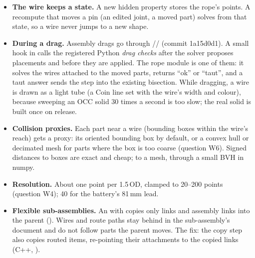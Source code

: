 \begin{itemize}
  \item \textbf{The wire keeps a state.} A new hidden property stores the rope's points. A recompute that moves a
        pin (an edited joint, a moved part) solves from that state, so a wire never jumps to a new shape.
  \item \textbf{During a drag.} Assembly drags go through //
        (commit 1a15d0d1). A small \code{[BW]} hook in  calls the registered
        Python \emph{drag checks} after the solver proposes placements and before they are applied. The rope
        module is one of them: it solves the wires attached to the moved parts, returns ``ok'' or ``taut'', and
        a taut answer sends the step into the existing bisection. While dragging, a wire is drawn as a light
        tube (a Coin line set with the wire's width and colour), because sweeping an OCC solid 30 times a second is
        too slow; the real solid is built once on release.
  \item \textbf{Collision proxies.} Each part near a wire (bounding boxes within the wire's reach) gets a proxy:
        its oriented bounding box by default, or a convex hull or decimated mesh for parts where the box is too coarse
        (question W6). Signed distances to boxes are exact and cheap; to a mesh, through a small BVH in numpy.
  \item \textbf{Resolution.} About one point per 1.5\,OD, clamped to 20--200 points (question W4); 40 for the
        battery's 81\,mm lead.
  \item \textbf{Flexible sub-assemblies.} An  with  copies only links and
        assembly links into the parent (). Wires and route paths stay behind in the
        sub-assembly's document and do not follow parts the parent moves. The fix: the copy step also copies
        routed items, re-pointing their attachments to the copied links (C++, \code{[BW]}).
\end{itemize}

